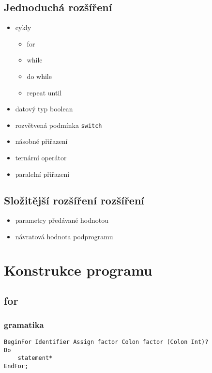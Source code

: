 \documentclass{style}
\begin{document}
\subsection{Jednoduchá rozšíření}
\begin{itemize}
\item cykly \\
\begin{itemize}
\item for \\
\item while \\
\item do while \\
\item repeat until \\
\end{itemize}
\item datový typ boolean \\
\item rozvětvená podmínka \verb|switch| \\
\item násobné přiřazení \\
\item ternární operátor \\
\item paralelní přiřazení \\
\end{itemize}

\subsection{Složitější rozšíření rozšíření}
\begin{itemize}
\item parametry předávané hodnotou \\
\item návratová hodnota podprogramu \\
\end{itemize}

\section{Konstrukce programu}
\subsection{for}
\subsubsection{gramatika}
\begin{lstlisting}
BeginFor Identifier Assign factor Colon factor (Colon Int)? 
Do 
	statement* 
EndFor;
\end{lstlisting}
\end{document}

